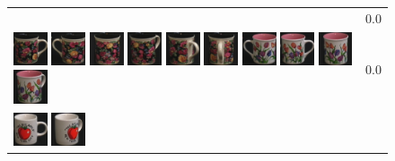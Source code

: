 \begin{figure}[bp]
\begin{tabular}{m{11cm} | m{3cm} |}
& {\scriptsize 0.0}
\\
\includegraphics[width=1cm]{coil/beeld-60.eps}
\includegraphics[width=1cm]{coil/beeld-61.eps}
\includegraphics[width=1cm]{coil/beeld-62.eps}
\includegraphics[width=1cm]{coil/beeld-63.eps}
\includegraphics[width=1cm]{coil/beeld-64.eps}
\includegraphics[width=1cm]{coil/beeld-65.eps}
\includegraphics[width=1cm]{coil/beeld-7.eps}
\includegraphics[width=1cm]{coil/beeld-6.eps}
\includegraphics[width=1cm]{coil/beeld-8.eps}
\includegraphics[width=1cm]{coil/beeld-9.eps}
& {\scriptsize 0.0}
\\
\includegraphics[width=1cm]{coil/beeld-36.eps}
\includegraphics[width=1cm]{coil/beeld-39.eps}

\end{tabular}
\end{figure}
